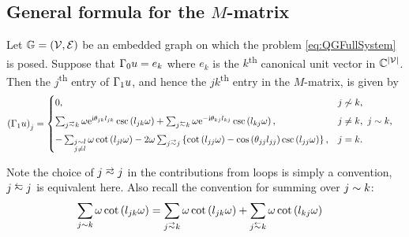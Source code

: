 \subsection{General formula for the $M$-matrix} \label{ssec:MMatrixResult}
\begin{prop} \label{prop:M-MatrixEntries}
	Let $\mathbb{G}=\left( \mathcal{V},\mathcal{E} \right)$ be an embedded graph on which the problem \eqref{eq:QGFullSystem} is posed.
	Suppose that $\Gamma_0 u = e_k$ where $e_k$ is the $k$\textsuperscript{th} canonical unit vector in $\mathbb{C}^{\left\lvert \mathcal{V} \right\rvert}$.
	Then the $j$\textsuperscript{th} entry of $\Gamma_1 u$, and hence the $jk$\textsuperscript{th} entry in the $M$-matrix, is given by
	\begin{align*}
		\bracs{\nmap u}_j &= 
		\begin{cases}
			0,	
			& j \not\con k, \\[5pt]
			\sum_{j\conLeft k} \omega \e^{\rmi\qm_{jk}l_{jk}} \csc\bracs{l_{jk}\omega} 
			+ \sum_{j\conRight k} \omega \e^{-\rmi\qm_{kj}l_{kj}} \csc\bracs{l_{kj}\omega},
			& j\neq k, \ j\con k, \\[5pt]
			- \sum_{\substack{j\con l \\ j\neq l}} \omega\cot\bracs{l_{jl}\omega}
			- 2\omega\sum_{j\conLeft j} \clbracs{ \cot\bracs{l_{jj}\omega} - \cos\bracs{\qm_{jj}l_{jj}}\csc\bracs{l_{jj}\omega} },
			& j=k.
		\end{cases}
	\end{align*}
\end{prop}
Note the choice of $j\conLeft j$ in the contributions from loops is simply a convention, $j\conRight j$ is equivalent here.
Also recall the convention for summing over $j\sim k$:
\begin{align*}
	\sum_{j\con k} \omega\cot\bracs{l_{jk}\omega} &= \sum_{j\conLeft k} \omega\cot\bracs{l_{jk}\omega}	+ \sum_{j\conRight k} \omega\cot\bracs{l_{kj}\omega}
\end{align*}
